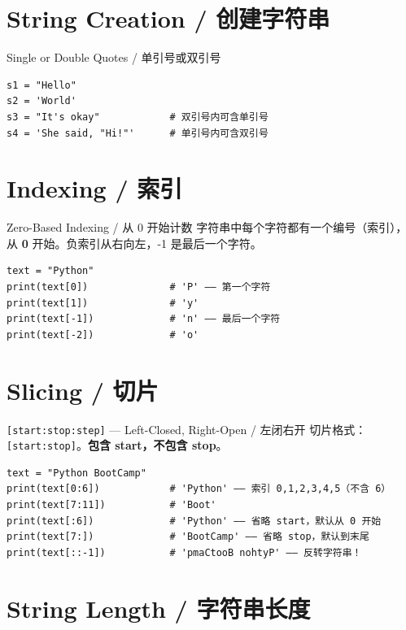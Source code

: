 \documentclass[11pt,a4paper]{report}
\let\oldtexttt\texttt
\renewcommand{\texttt}[1]{\textcolor{mainblue}{\oldtexttt{#1}}}
\begin{document}
\section{String Creation / 创建字符串}

\begin{concept}{Single or Double Quotes / 单引号或双引号}
\begin{lstlisting}
s1 = "Hello"
s2 = 'World'
s3 = "It's okay"            # 双引号内可含单引号
s4 = 'She said, "Hi!"'      # 单引号内可含双引号
\end{lstlisting}
\end{concept}

\section{Indexing / 索引}

\begin{concept}{Zero-Based Indexing / 从 0 开始计数}
字符串中每个字符都有一个编号（索引），从 \textbf{0} 开始。负索引从右向左，-1 是最后一个字符。
\begin{lstlisting}
text = "Python"
print(text[0])              # 'P' —— 第一个字符
print(text[1])              # 'y'
print(text[-1])             # 'n' —— 最后一个字符
print(text[-2])             # 'o'
\end{lstlisting}
\end{concept}

\section{Slicing / 切片}

\begin{concept}{\texttt{[start:stop:step]} — Left-Closed, Right-Open / 左闭右开}
切片格式：\texttt{[start:stop]}。\textbf{包含 start，不包含 stop}。
\begin{lstlisting}
text = "Python BootCamp"
print(text[0:6])            # 'Python' —— 索引 0,1,2,3,4,5（不含 6）
print(text[7:11])           # 'Boot'
print(text[:6])             # 'Python' —— 省略 start，默认从 0 开始
print(text[7:])             # 'BootCamp' —— 省略 stop，默认到末尾
print(text[::-1])           # 'pmaCtooB nohtyP' —— 反转字符串！
\end{lstlisting}
\end{concept}

\section{String Length / 字符串长度}
\end{document}

